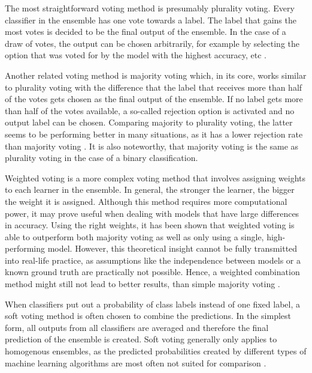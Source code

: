 The most straightforward voting method is presumably plurality voting. Every classifier in the ensemble has one vote towards a label. The label that gains the most votes is decided to be the final output of the ensemble. In the case of a draw of votes, the output can be chosen arbitrarily, for example by selecting the option that was voted for by the model with the highest accuracy, etc \cite{zhou2012}. 

Another related voting method is majority voting which, in its core, works similar to plurality voting with the difference that the label that receives more than half of the votes gets chosen as the final output of the ensemble. If no label gets more than half of the votes available, a so-called rejection option is activated and no output label can be chosen. Comparing majority to plurality voting, the latter seems to be performing better in many situations, as it has a lower rejection rate than majority voting \cite{lin2003}. It is also noteworthy, that majority voting is the same as plurality voting in the case of a binary classification. 

Weighted voting is a more complex voting method that involves assigning weights to each learner in the ensemble. In general, the stronger the learner, the bigger the weight it is assigned. Although this method requires more computational power, it may prove useful when dealing with models that have large differences in accuracy. Using the right weights, it has been shown that weighted voting is able to outperform both majority voting as well as only using a single, high-performing model. However, this theoretical insight cannot be fully transmitted into real-life practice, as assumptions like the independence between models or a known ground truth are practically not possible. Hence, a weighted combination method might still not lead to better results, than simple majority voting \cite{zhou2012}.

When classifiers put out a probability of class labels instead of one fixed label, a soft voting method is often chosen to combine the predictions. In the simplest form, all outputs from all classifiers are averaged and therefore the final prediction of the ensemble is created. Soft voting generally only applies to homogenous ensembles, as the predicted probabilities created by different types of machine learning algorithms are most often not suited for comparison \cite{zhou2012}.

